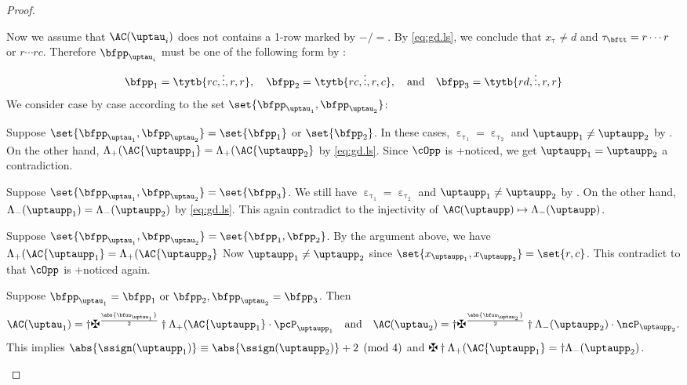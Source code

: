 \documentclass[ssunip]{subfiles}
\begin{document}
\begin{proof}
\begin{enumPF}
\item
Now we assume that $\oAC{\uptau_{i}}$ does not contains a 1-row marked by $-/=$.
By \eqref{eq:gd.ls}, we conclude that $x_{\uptau}\neq d$ and
$\tau_{\bftt} = r\cdots r$ or $ r\cdots rc$. Therefore $\bfpp_{\uptau_{i}}$
must be one of the following form by :
  \[
    \bfpp_{1} =\tytb{rc,\vdots,r,r}, \quad \bfpp_{2}=\tytb{rc,\vdots,r,c}, \quad\text{and}
    \quad\bfpp_{3}= \tytb{rd,\vdots,r,r}\\
  \]
  We consider case by case according to the set $\set{\bfpp_{\uptau_{1}},\bfpp_{\uptau_{2}}}$:
  \begin{enumPF}
    \item Suppose
    $\set{\bfpp_{\uptau_{1}},\bfpp_{\uptau_{2}}}=\set{\bfpp_{1}}$ or $ \set{\bfpp_{2}}$.
    In these cases, $\upepsilon_{\uptau_{1}}=\upepsilon_{\uptau_{2}}$ and
    $\uptaupp_{1}\neq \uptaupp_{2}$ by .
    On the other hand, $\Lambda_+(\AC{\uptaupp_{1}}=\Lambda_+(\AC{\uptaupp_{2}}$ by \eqref{eq:gd.ls}.
    Since $\cOpp$ is +noticed, we get $\uptaupp_{1}=\uptaupp_{2}$ a contradiction.
    \item Suppose
    $\set{\bfpp_{\uptau_{1}},\bfpp_{\uptau_{2}}}=\set{\bfpp_{3}}$.
    We still have $\upepsilon_{\uptau_{1}}=\upepsilon_{\uptau_{2}}$ and
    $\uptaupp_{1}\neq \uptaupp_{2}$ by .
    On the other hand, $\nAC{\uptaupp_{1}}=\nAC{\uptaupp_{2}}$ by \eqref{eq:gd.ls}.
    This again contradict to the injectivity of $\oAC{\uptaupp}\mapsto \nAC{\uptaupp}$.
    \item  Suppose
    $\set{\bfpp_{\uptau_{1}},\bfpp_{\uptau_{2}}} = \set{\bfpp_{1},\bfpp_{2}}$.
    By the argument above, we have $\Lambda_+(\AC{\uptaupp_{1}}=\Lambda_+(\AC{\uptaupp_{2}}$
    Now $\uptaupp_{1}\neq \uptaupp_{2}$ since $\set{x_{\uptaupp_{1}},x_{\uptaupp_{2}}}=\set{r,c}$.
    This contradict to that $\cOpp$ is +noticed again.
    \item\label{it:c:noticed.bij.4} Suppose $\bfpp_{\uptau_{1}} = \bfpp_{1} \text{ or } \bfpp_{2}, \bfpp_{\uptau_{2}}=\bfpp_{3}$.
    Then
   \[
    \oAC{\uptau_{1}} = \dagger\maltese^{\frac{\abs{\bfuu_{\uptau_{1}}}}{2}}\dagger\Lambda_+(\AC{\uptaupp_{1}}\cdot \pcP_{\uptaupp_{1}}
    \quad \text{and} \quad
    \oAC{\uptau_{2}} = \dagger\maltese^{\frac{\abs{\bfuu_{\uptau_{2}}}}{2}}\dagger\nAC{\uptaupp_{2}}\cdot \ncP_{\uptaupp_{2}}.
    \]
    This implies
    $\abs{\ssign(\uptaupp_{1})} \equiv \abs{\ssign(\uptaupp_{2})}+2 \pmod{4}$
    and
    $\maltese \dagger \Lambda_+(\AC{\uptaupp_{1}}= \dagger\nAC{\uptaupp_{2}}$.



\end{enumPF}
\end{enumPF}
\end{proof}
\end{document}
